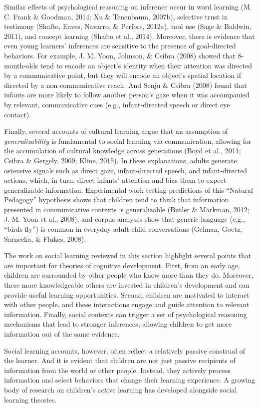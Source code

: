 \documentclass[oneside]{report}
\begin{document}
Similar effects of psychological reasoning on inference occur in word
learning (M. C. Frank \& Goodman, 2014; Xu \& Tenenbaum, 2007b),
selective trust in testimony (Shafto, Eaves, Navarro, \& Perfors,
2012a), tool use (Sage \& Baldwin, 2011), and concept learning (Shafto
et al., 2014). Moreover, there is evidence that even young learners'
inferences are sensitive to the presence of goal-directed behaviors. For
example, J. M. Yoon, Johnson, \& Csibra (2008) showed that 8-month-olds
tend to encode an object's identity when their attention was directed by
a communicative point, but they will encode an object's spatial location
if directed by a non-communicative reach. And Senju \& Csibra (2008)
found that infants are more likely to follow another person's gaze when
it was accompanied by relevant, communicative cues (e.g.,
infant-directed speech or direct eye contact).

Finally, several accounts of cultural learning argue that an assumption
of \emph{generalizability} is fundamental to social learning via
communication, allowing for the accumulation of cultural knowledge
across generations (Boyd et al., 2011; Csibra \& Gergely, 2009; Kline,
2015). In these explanations, adults generate ostensive signals such as
direct gaze, infant-directed speech, and infant-directed actions, which,
in turn, direct infants' attention and bias them to expect generalizable
information. Experimental work testing predictions of this ``Natural
Pedagogy'' hypothesis shows that children tend to think that information
presented in communicative contexts is generalizable (Butler \& Markman,
2012; J. M. Yoon et al., 2008), and corpus analyses show that generic
language (e.g., ``birds fly'') is common in everyday adult-child
conversations (Gelman, Goetz, Sarnecka, \& Flukes, 2008).

The work on social learning reviewed in this section highlight several
points that are important for theories of cognitive development. First,
from an early age, children are surrounded by other people who know more
than they do. Moreover, these more knowledgeable others are invested in
children's development and can provide useful learning opportunities.
Second, children are motivated to interact with other people, and these
interactions engage and guide attention to relevant information.
Finally, social contexts can trigger a set of psychological reasoning
mechanisms that lead to stronger inferences, allowing children to get
more information out of the same evidence.

Social learning accounts, however, often reflect a relatively passive
construal of the learner. And it is evident that children are not just
passive recipients of information from the world or other people.
Instead, they actively process information and select behaviors that
change their learning experience. A growing body of research on
children's active learning has developed alongside social learning
theories.
\end{document}
